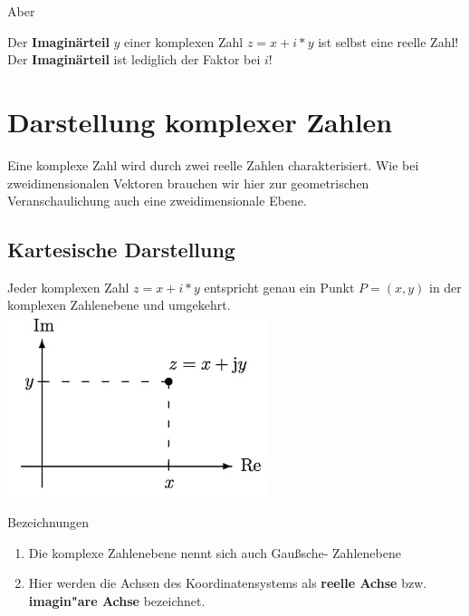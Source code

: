 \begin{Bemerkung}
Aber\\
\end{Bemerkung}

Der  \textbf{Imaginärteil} $y$ einer komplexen Zahl  $z =x+i*y$ ist selbst eine reelle Zahl! Der \textbf{Imaginärteil} ist lediglich der Faktor bei $i$!\\

	\section{Darstellung komplexer Zahlen}

Eine komplexe Zahl wird durch zwei reelle Zahlen charakterisiert. Wie bei zweidimensionalen Vektoren brauchen wir hier zur geometrischen Veranschaulichung auch eine zweidimensionale Ebene.\\

	\subsection{Kartesische Darstellung}

Jeder komplexen Zahl $z =x+i*y$ entspricht genau ein Punkt $P =(x,y)$ in der komplexen Zahlenebene und umgekehrt.\\

\includegraphics[width=3in]{kap6/komplexezahlen1}

\begin{Bemerkung}
Bezeichnungen\\
\end{Bemerkung}

\begin{enumerate}
\item Die komplexe Zahlenebene nennt sich auch Gaußsche- Zahlenebene
\item Hier werden die Achsen des Koordinatensystems als \textbf{reelle Achse} bzw. \textbf{imagin"are Achse} bezeichnet.\\
\end{enumerate}

